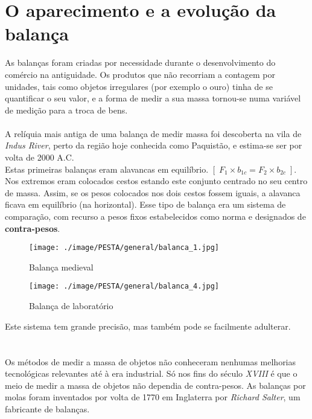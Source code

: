 \section{O aparecimento e a evolução da balança}
As balanças foram criadas por necessidade durante o desenvolvimento do comércio na antiguidade. Os produtos que não recorriam a contagem por unidades, tais como objetos irregulares (por exemplo o ouro) tinha de se quantificar o seu valor, e a forma de medir a sua massa tornou-se numa variável de medição para a troca de bens.
\\
\\
A relíquia mais antiga de uma balança de medir massa foi descoberta na vila de \textit{Indus River}, perto da região hoje conhecida como Paquistão, e estima-se ser por volta de 2000 A.C.
\\
Estas primeiras balanças eram alavancas em equilíbrio. $[ \; F_{1} \times b_{1c} = F_{2} \times b_{2c} \; ]$. Nos extremos eram colocados cestos estando este conjunto centrado no seu centro de massa. Assim, se os pesos colocados nos dois cestos fossem iguais, a alavanca ficava em equilíbrio (na horizontal). Esse tipo de balança era um sistema de comparação, com recurso a pesos fixos estabelecidos como norma e designados de \textbf{contra-pesos}.
\\
\begin{minipage}[!b]{0.5\linewidth}
	\begin{figure}[H]
		\flushleft
		\texttt{[image: ./image/PESTA/general/balanca\_1.jpg]}
		\caption{Balança medieval}
		\label{balanca_1}
	\end{figure}
\end{minipage}
\hspace{1cm}
\begin{minipage}[!b]{0.5\linewidth}
	\begin{figure}[H]
		\centering
		\texttt{[image: ./image/PESTA/general/balanca\_4.jpg]}
		\caption{Balança de laboratório}
		\label{balanca_4}
	\end{figure}
\end{minipage}
\newline
\newline
\newline
Este sistema tem grande precisão, mas também pode se facilmente adulterar.
\\
\\
\\
Os métodos de medir a massa de objetos não conheceram nenhumas melhorias tecnológicas relevantes até à era industrial. Só nos fins do século \textit{XVIII} é que o meio de medir a massa de objetos não dependia de contra-pesos. As balanças por molas foram inventados por volta de 1770 em Inglaterra por \textit{Richard Salter}, um fabricante de balanças.
